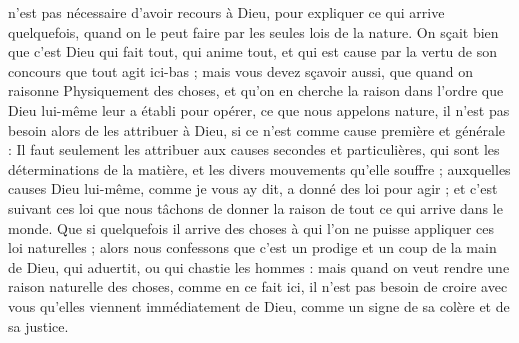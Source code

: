 \documentclass[a4paper, 11pt, oneside, polutonikogreek, french, landscape, twocolumn]{article}
\begin{document}
n'est pas nécessaire d'avoir recours à Dieu, pour expliquer ce qui arrive quelquefois, quand on le peut faire par les seules lois de la nature. On sçait bien que c'est Dieu qui fait tout, qui anime tout, et qui est cause par la vertu de son concours que tout agit ici-bas ; mais vous devez sçavoir aussi, que quand on raisonne Physiquement des choses, et qu'on en cherche la raison dans l'ordre que Dieu lui-même leur a établi pour opérer, ce que nous appelons nature, il n'est pas besoin alors de les attribuer à Dieu, si ce n'est comme cause première et générale : Il faut seulement les attribuer aux causes secondes et particulières, qui sont les déterminations de la matière, et les divers mouvements qu'elle souffre ; auxquelles causes Dieu lui-même, comme je vous ay dit, a donné des loi pour agir ; et c'est suivant ces loi que nous tâchons de donner la raison de tout ce qui arrive dans le monde. Que si quelquefois il arrive des choses à qui l'on ne puisse appliquer ces loi naturelles ; alors nous confessons que c'est un prodige et un coup de la main de Dieu, qui aduertit, ou qui chastie les hommes : mais quand on veut rendre une raison naturelle des choses, comme en ce fait ici, il n'est pas besoin de croire avec vous qu'elles viennent immédiatement de Dieu, comme un signe de sa colère et de sa justice.
\clearpage
\end{document}
